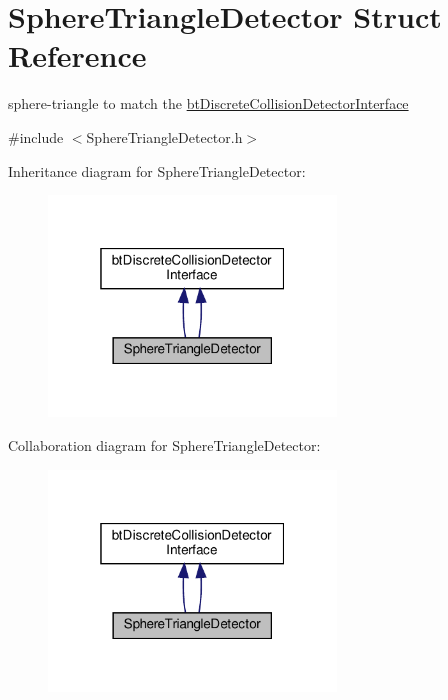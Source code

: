 \hypertarget{structSphereTriangleDetector}{}\section{Sphere\+Triangle\+Detector Struct Reference}
\label{structSphereTriangleDetector}


sphere-\/triangle to match the \hyperlink{structbtDiscreteCollisionDetectorInterface}{bt\+Discrete\+Collision\+Detector\+Interface}  




{\ttfamily \#include $<$Sphere\+Triangle\+Detector.\+h$>$}



Inheritance diagram for Sphere\+Triangle\+Detector\+:
\nopagebreak
\begin{figure}[H]
\begin{center}
\leavevmode
\includegraphics[width=217pt]{structSphereTriangleDetector__inherit__graph}
\end{center}
\end{figure}


Collaboration diagram for Sphere\+Triangle\+Detector\+:
\nopagebreak
\begin{figure}[H]
\begin{center}
\leavevmode
\includegraphics[width=217pt]{structSphereTriangleDetector__coll__graph}
\end{center}
\end{figure}
